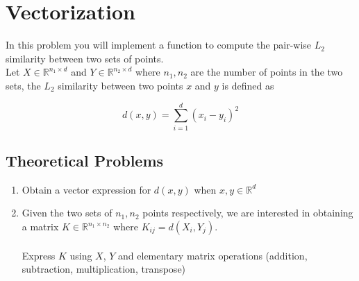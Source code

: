 \documentclass{article}
\begin{document}
\section{Vectorization}
In this problem you will implement a function to compute the pair-wise $L_2$ similarity between two sets of points. \\
Let $X \in \mathbb{R}^{n_1 \times d}$ and $Y \in \mathbb{R}^{n_2 \times d}$ where $n_1, n_2$ are the number of points in the two sets, the $L_2$ similarity between two points $x$ and $y$ is defined as 

\begin{equation*}
    d(x,y) = \sum_{i=1}^d (x_i - y_i)^2
\end{equation*}

\subsection{Theoretical Problems}

\begin{enumerate}[leftmargin=*, label=(\alph*)]
\item Obtain a vector expression for $d(x,y)$ when $x , y \in \mathbb{R}^d$
\item Given the two sets of $n_1, n_2$ points respectively, we are interested in obtaining a matrix $K \in \mathbb{R}^{n_1 \times n_2}$ where $K_{ij} = d(X_i,Y_j)$. \\\\
Express $K$ using $X$, $Y$ and elementary matrix operations (addition, subtraction, multiplication, transpose)
\end{enumerate}
\end{document}
